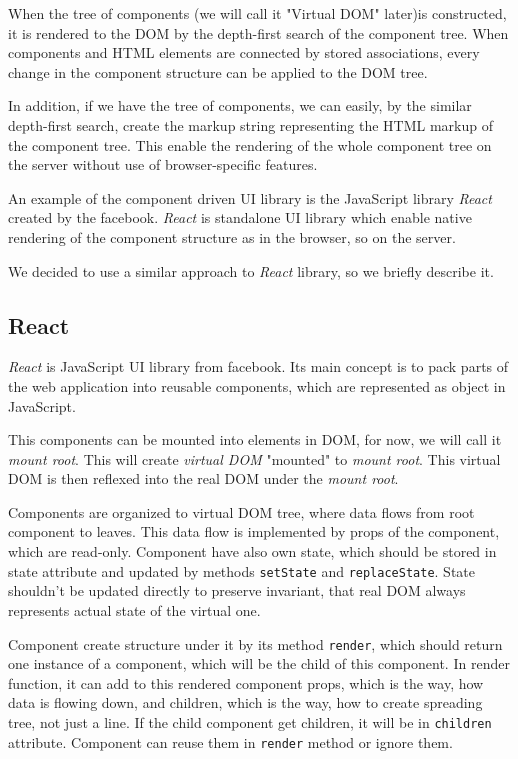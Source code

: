 \documentclass[oneside, 12pt]{book}
\begin{document}
	When the tree of components (we will call it "Virtual DOM" later)is constructed, 
	it is rendered to the DOM by the depth-first search of the component tree.
	When components and HTML elements are connected by stored associations, 
	every change in the component structure can be applied to the DOM tree. 

	In addition, if we have the tree of components, we can easily, by the similar depth-first search, 
	create the markup string representing the HTML markup of the component tree.
	This enable the rendering of the whole component tree on the server without use of browser-specific features.

	An example of the component driven UI library is the JavaScript library \textit{React} created by the facebook.
  \textit{React} is standalone UI library which enable native rendering of the component structure as in the browser, so on the server.

	We decided to use a similar approach to \textit{React} library, so we briefly describe it.

	\subsection{React}\label{subsec:existing-component-react}
		
		\textit{React} is JavaScript UI library from facebook. 
		Its main concept is to pack parts of the web application into reusable components, 
		which are represented as object in JavaScript. 

		This components can be mounted into elements in DOM, for now, we will call it \textit{mount root}. 
		This will create \textit{virtual DOM} "mounted" to \textit{mount root}. 
		This virtual DOM is then reflexed into the real DOM under the \textit{mount root}.

		Components are organized to virtual DOM tree, where data flows from root component to leaves. 
		This data flow is implemented by props of the component, which are read-only.
		Component have also own state, which should be stored in state attribute and updated by methods \texttt{setState} and \texttt{replaceState}. 
		State shouldn't be updated directly to preserve invariant, that real DOM always represents actual state of the virtual one. 

		Component create structure under it by its method \texttt{render}, which should return one instance of a component, 
		which will be the child of this component.
		In render function, it can add to this rendered component props, which is the way, how data is flowing down, 
		and children, which is the way, how to create spreading tree, not just a line. 
		If the child component get children, it will be in \texttt{children} attribute. Component can reuse them in \texttt{render} method or ignore them.
\end{document}
